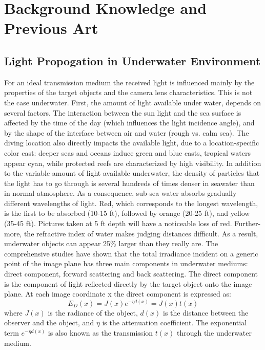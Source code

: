 \documentclass[hidelinks, 12pt]{report}
\begin{document}
\chapter{Background Knowledge and Previous Art}
\section{Light Propogation in Underwater Environment}
\justify
For an ideal transmission medium the received light is influenced mainly by the properties of the target objects and the camera lens characteristics. This is not the case underwater. First, the amount of light available under water, depends on several factors. The interaction between the sun light and the sea surface is affected by the time of the day (which influences the light incidence angle), and by the shape of
the interface between air and water (rough vs. calm sea). The diving location also directly impacts the available light, due to a location-specific color cast: deeper seas and oceans induce green and blue casts, tropical waters appear cyan, while protected reefs are characterized by high visibility. In addition to the variable amount of light available underwater, the density of particles that the light has to go through
is several hundreds of times denser in seawater than in normal atmosphere. As a consequence, sub-sea water absorbs gradually different wavelengths of light. Red, which corresponds to the longest wavelength, is the first to be absorbed (10-15 ft), followed by orange (20-25 ft), and yellow (35-45 ft). Pictures taken at 5 ft depth will have a noticeable loss of red. Further-more, the refractive index of water makes judging distances difficult. As a result, underwater objects can appear 25\% larger than they really are. The comprehensive studies have shown that the total irradiance incident on a generic point of the image plane has three main components in underwater mediums: direct component, forward scattering and back scattering. The direct component is the component of light reflected directly by the target object onto the image plane. At each image coordinate x the direct component is expressed as:
\begin{equation}
E_D(x)=J(x)e^{-\eta d(x)}=J(x)t(x)
\end{equation}
where $J(x)$ is the radiance of the object, $d(x)$ is the distance between the observer and the object, and $\eta$ is the attenuation coefficient. The exponential term $e^{−\eta d(x)}$ is also known as the transmission $t(x)$ through the underwater medium.\\
\end{document}
